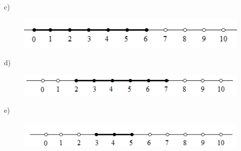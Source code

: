\documentclass[12pt]{article}
\renewcommand{\_}{\kern-1.5pt\textunderscore\kern-1.5pt}
\begin{document}
\begin{enumerate}
\par

c)\par




\begin{figure}[H]
	\begin{Center}
		\includegraphics[width=4.56in,height=0.61in]{./media/image13.png}
	\end{Center}
\end{figure}



\par

d)\par




\begin{figure}[H]
	\begin{Center}
		\includegraphics[width=4.84in,height=0.45in]{./media/image14.png}
	\end{Center}
\end{figure}



\par

e)\par




\begin{figure}[H]
	\begin{Center}
		\includegraphics[width=4.94in,height=0.54in]{./media/image15.png}
	\end{Center}
\end{figure}



\end{enumerate}
\end{document}
